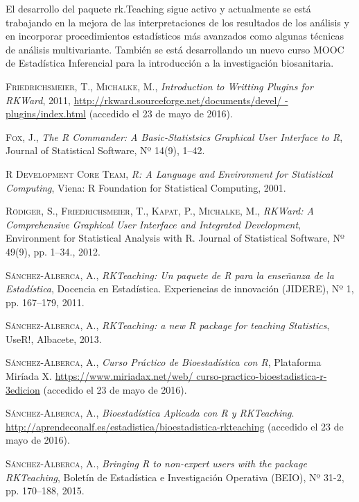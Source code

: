 \documentclass[a4paper,10pt,twoside]{article}
\newcommand{\rkteaching}{\textsf{rk.Teaching}}
\begin{document}
El desarrollo del paquete \rkteaching{} sigue activo y actualmente se está trabajando en la mejora de las interpretaciones
de los resultados de los análisis y en incorporar procedimientos estadísticos más avanzados como algunas técnicas de
análisis multivariante. 
También se está desarrollando un nuevo curso MOOC de Estadística Inferencial para la introducción a la investigación
biosanitaria. 

\begin{thebibliography}{9}

\textsc{Friedrichsmeier}, T., \textsc{Michalke}, M., \textit{Introduction to Writting Plugins
for RKWard}, 2011, \url{http://rkward.sourceforge.net/documents/devel/
-plugins/index.html} (accedido el 23 de mayo de 2016).

\textsc{Fox}, J., \textit{The R Commander: A Basic-Statistsics Graphical User Interface to R}, Journal
of Statistical Software, Nº 14(9), 1--42.

\textsc{R Development Core Team}, \textit{R: A Language and Environment for Statistical Computing}, Viena: R Foundation
for Statistical Computing, 2001. 

\textsc{Rödiger}, S., \textsc{Friedrichsmeier}, T., \textsc{Kapat}, P., \textsc{Michalke}, M., \textit{RKWard: A
Comprehensive Graphical User Interface and Integrated Development}, Environment for Statistical Analysis
with R. Journal of Statistical Software, Nº 49(9), pp. 1--34., 2012.

\textsc{Sánchez-Alberca}, A., \textit{RKTeaching: Un paquete de R para la enseñanza de la Estadística}, Docencia en
Estadística. Experiencias de innovación (JIDERE), Nº 1, pp. 167--179, 2011.

\textsc{Sánchez-Alberca}, A., \textit{RKTeaching: a new R package for teaching Statistics}, UseR!, Albacete, 2013. 

\textsc{Sánchez-Alberca}, A., \textit{Curso Práctico de Bioestadística con R}, Plataforma Miríada X.
\url{https://www.miriadax.net/web/ curso-practico-bioestadistica-r-3edicion} (accedido el 23 de mayo de 2016).

\textsc{Sánchez-Alberca}, A., \textit{Bioestadística Aplicada con R y RKTeaching}.
\url{http://aprendeconalf.es/estadistica/bioestadistica-rkteaching} (accedido el 23 de mayo de 2016).

\textsc{Sánchez-Alberca}, A., \textit{Bringing R to non-expert users with the package RKTeaching}, Boletín de
Estadística e Investigación Operativa (BEIO), Nº 31-2, pp. 170--188, 2015.

\end{thebibliography}
\end{document}
